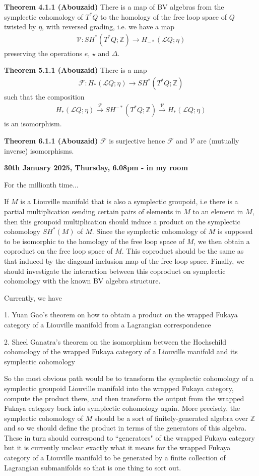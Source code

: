 \documentclass[hidelinks, 12pt]{article}
\theoremstyle{mydefstyle}
\theoremstyle{mythmstyle}
\begin{document}
\textbf{Theorem 4.1.1 (Abouzaid)} There is a map of BV algebras from the symplectic cohomology of $T^*Q$ to the homology of the free loop space of $Q$ twisted by $\eta$, with reversed grading, i.e. we have a map
\begin{gather*}
\mathcal{V} : SH^*(T^*Q; \mathbb{Z}) \to H_{-*}(\mathcal{L}Q; \eta)
\end{gather*}
preserving the operations $e$, $\star$ and $\Delta$. 

\textbf{Theorem 5.1.1 (Abouzaid)} There is a map
\begin{gather*}
\mathcal{F} : H_*(\mathcal{L}Q; \eta) \to SH^*(T^*Q; \mathbb{Z})
\end{gather*}
such that the composition
\begin{gather*}
H_*(\mathcal{L}Q; \eta) \xrightarrow{\mathcal{F}} SH^{-*}(T^*Q; \mathbb{Z}) \xrightarrow{\mathcal{V}} H_*(\mathcal{L}Q; \eta)
\end{gather*}
is an isomorphism.

\textbf{Theorem 6.1.1 (Abouzaid)} $\mathcal{F}$ is surjective hence $\mathcal{F}$ and $\mathcal{V}$ are (mutually inverse) isomorphisms.

\newpage

\textbf{30th January 2025, Thursday, 6.08pm - in my room}

For the millionth time...

If $M$ is a Liouville manifold that is also a symplectic groupoid, i.e there is a partial multiplication sending certain pairs of elements in $M$ to an element in $M$, then this groupoid multiplication should induce a product on the symplectic cohomology $SH^*(M)$ of $M$. Since the symplectic cohomology of $M$ is supposed to be isomorphic to the homology of the free loop space of $M$, we then obtain a coproduct on the free loop space of $M$. This coproduct should be the same as that induced by the diagonal inclusion map of the free loop space. Finally, we should investigate the interaction between this coproduct on symplectic cohomology with the known BV algebra structure. 

Currently, we have

1. Yuan Gao's theorem on how to obtain a product on the wrapped Fukaya category of a Liouville manifold from a Lagrangian correspondence

2. Sheel Ganatra's theorem on the isomorphism between the Hochschild cohomology of the wrapped Fukaya category of a Liouville manifold and its symplectic cohomology

So the most obvious path would be to transform the symplectic cohomology of a symplectic groupoid Liouville manifold into the wrapped Fukaya category, compute the product there, and then transform the output from the wrapped Fukaya category back into symplectic cohomology again. More precisely, the symplectic cohomology of $M$ should be a sort of finitely-generated algebra over $\mathbb{Z}$ and so we should define the product in terms of the generators of this algebra. These in turn should correspond to ``generators" of the wrapped Fukaya category but it is currently unclear exactly what it means for the wrapped Fukaya category of a Liouville manifold to be generated by a finite collection of Lagrangian submanifolds so that is one thing to sort out. 
\end{document}
